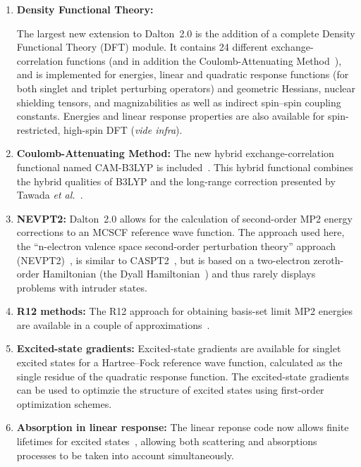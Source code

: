 \begin{enumerate}
\item{\bf Density Functional Theory:}

The largest new extension to Dalton~2.0 is the addition of a complete
Density Functional Theory (DFT) module. It contains 24 different
exchange-correlation  functions (and in addition the
Coulomb-Attenuating Method~\cite{tydptnchcpl393}), and is implemented for energies,
linear and quadratic response functions (for both singlet and triplet
perturbing operators) and geometric Hessians, nuclear shielding
tensors, and magnizabilities as well as indirect spin--spin coupling
constants. Energies and linear response properties are also available
for spin-restricted, high-spin DFT ({\em vide infra\/}).

\item{\bf Coulomb-Attenuating Method:} The new hybrid
  exchange-correlation functional named CAM-B3LYP is
  included~\cite{tydptnchcpl393}. This hybrid functional  combines the
  hybrid qualities of B3LYP and the long-range correction presented by
  Tawada {\it et al.\/}~\cite{ytttsytykhjcp120}.


\item{\bf NEVPT2:} Dalton~2.0 allows for the calculation of
  second-order MP2 energy corrections to an MCSCF reference wave
  function. The approach used here, the ``n-electron valence space
  second-order perturbation theory'' approach (NEVPT2)~\cite{carcsetljpmjcp114,carcjpmcpl350,carcjpmjcp117}, is similar to
  CASPT2~\cite{kapamborjcp96}, but is based on a two-electron zeroth-order
  Hamiltonian (the Dyall Hamiltonian~\cite{kgdjcp102}) and thus rarely displays
  problems with intruder states.

\item{\bf R12 methods:} The R12 approach for obtaining basis-set limit
MP2 energies are available in a couple of  approximations~\cite{wkccmsjcp116,ccmswkthcpc149}.

\item{\bf Excited-state gradients:} Excited-state gradients are
  available for singlet excited states for a Hartree--Fock reference
  wave function, calculated as the single residue of the quadratic
  response function. The excited-state gradients can be used to
  optimzie the structure of excited states using first-order
  optimization schemes.

\item{\bf Absorption in linear response:} The linear reponse code now
  allows finite lifetimes for excited states~\cite{pndmbhjajjojcp115}, allowing both scattering
  and absorptions processes to be taken into account simultaneously.


\end{enumerate}
